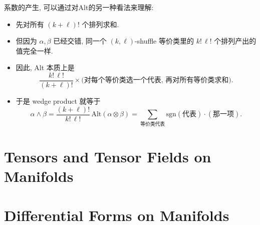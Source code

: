 \documentclass[../main.tex]{subfiles}
\begin{document}
\begin{remark}
    系数的产生, 可以通过对Alt的另一种看法来理解: 
    \begin{itemize}
        \item 先对所有 \((k+\ell)!\) 个排列求和.
        \item 但因为 \(\alpha,\beta\) 已经交错, 同一个 \((k,\ell)\)-shuffle 等价类里的 \(k!\,\ell!\) 个排列产出的值完全一样.
        \item 因此, Alt 本质上是
  \[
  \frac{k!\,\ell!}{(k+\ell)!}\times
  \bigl(\text{对每个等价类选一个代表, 再对所有等价类求和}\bigr).
  \]

  \item 于是 wedge product 就等于
  \[
  \alpha\wedge\beta
  = \frac{(k+\ell)!}{k!\,\ell!}\,\mathrm{Alt}(\alpha\otimes\beta)
  = \sum_{\text{等价类代表}}\mathrm{sgn}(\text{代表})\cdot(\text{那一项}).
  \]
    \end{itemize}
    
\end{remark}
\section{Tensors and Tensor Fields on Manifolds}

\section{Differential Forms on Manifolds}
\end{document}
